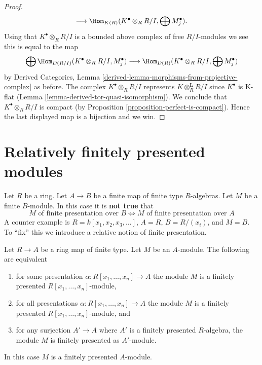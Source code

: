 \begin{proof}
$$\longrightarrow
\Hom_{K(R)}(K^\bullet \otimes_R R/I, \bigoplus M_j^\bullet).
$$
Using that $K^\bullet \otimes_R R/I$ is a bounded above complex
of free $R/I$-modules we see this is equal to the map
$$
\bigoplus \Hom_{D(R/I)}(K^\bullet \otimes_R R/I, M_j^\bullet)
\longrightarrow
\Hom_{D(R)}(K^\bullet \otimes_R R/I, \bigoplus M_j^\bullet)
$$
by Derived Categories,
Lemma \ref{derived-lemma-morphisms-from-projective-complex} as before.
The complex $K^\bullet \otimes_R R/I$ represents $K \otimes_R^\mathbf{L} R/I$
since $K^\bullet$ is K-flat (Lemma \ref{lemma-derived-tor-quasi-isomorphism}).
We conclude that $K^\bullet \otimes_R R/I$ is compact (by
Proposition \ref{proposition-perfect-is-compact}). Hence the last
displayed map is a bijection and we win.
\end{proof}








\section{Relatively finitely presented modules}
\label{section-relative-finite-presentation}

\noindent
Let $R$ be a ring. Let $A \to B$ be a finite map of finite type $R$-algebras.
Let $M$ be a finite $B$-module. In this case it is {\bf not true} that
$$
M\text{ of finite presentation over }B
\Leftrightarrow
M\text{ of finite presentation over }A
$$
A counter example is $R = k[x_1, x_2, x_3, \ldots]$, $A = R$, $B = R/(x_i)$,
and $M = B$. To ``fix'' this we introduce a relative notion of finite
presentation.

\begin{lemma}
\label{lemma-relatively-finitely-presented}
Let $R \to A$ be a ring map of finite type.
Let $M$ be an $A$-module.
The following are equivalent
\begin{enumerate}
\item for some presentation $\alpha : R[x_1, \ldots, x_n] \to A$
the module $M$ is a finitely presented $R[x_1, \ldots, x_n]$-module,
\item for all presentations $\alpha : R[x_1, \ldots, x_n] \to A$
the module $M$ is a finitely presented $R[x_1, \ldots, x_n]$-module, and
\item for any surjection $A' \to A$ where $A'$ is a finitely presented
$R$-algebra, the module $M$ is finitely presented as $A'$-module.
\end{enumerate}
In this case $M$ is a finitely presented $A$-module.
\end{lemma}

